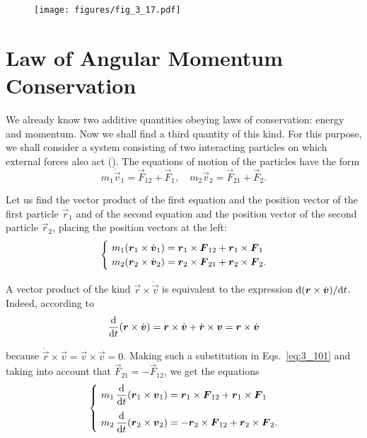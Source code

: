 \begin{figure}[t]
	\begin{center}
		\texttt{[image: figures/fig\_3\_17.pdf]}
		\caption[]{}
		\label{fig:3_17}
	\end{center}
	\vspace{-0.7cm}
\end{figure}

\section{Law of Angular Momentum Conservation}\label{sec:3_12}

We already know two additive quantities obeying laws of conservation: energy and momentum. Now we shall find a third quantity of this kind. For this purpose, we shall consider a system consisting of two interacting particles on which external forces also act (). The equations of motion of the particles have the form
\begin{equation*}
m_1\dot{\vec{v}}_1 = \vec{F}_{12} + \vec{F}_1,\quad m_2\dot{\vec{v}}_2 = \vec{F}_{21} + \vec{F}_2.
\end{equation*}

\noindent
Let us find the vector product of the first equation and the position vector of the first particle $\vec{r}_1$ and of the second equation and the position vector of the second particle $\vec{r}_2$, placing the position vectors at the left:
\begin{equation}\label{eq:3_101}
\begin{cases}
& \!\!\!\! m_1(\vec{r}_1\times\dot{\vec{v}}_1) = \vecprodind{r}{1}{F}{12} + \vecprodind{r}{1}{F}{1}\\
& \!\!\!\! m_2(\vec{r}_2\times\dot{\vec{v}}_2) = \vecprodind{r}{2}{F}{21} + \vecprodind{r}{2}{F}{2}.
\end{cases}
\end{equation}

A vector product of the kind $\vec{r}\times\dot{\vec{v}}$ is equivalent to the expression $\mathrm{d}(\boldsymbol{r}\times\dot{\boldsymbol{v}})/\mathrm{d} t$. Indeed, according to 
\begin{equation}\label{eq:3_102}
\frac{\mathrm{d}}{\mathrm{d} t}(\boldsymbol{r}\times\dot{\boldsymbol{v}}) = \boldsymbol{r}\times\dot{\boldsymbol{v}} + \dot{\boldsymbol{r}}\times\boldsymbol{v} = \boldsymbol{r}\times\dot{\boldsymbol{v}}
\end{equation}

\noindent
because $\dot{\vec{r}}\times\vec{v}=\vec{v}\times\vec{v}=0$. Making such a substitution in Eqs.~\eqref{eq:3_101} and taking into account that $\vec{F}_{21}=-\vec{F}_{12}$, we get the equations
\begin{equation}\label{eq:3_103}
\begin{cases}
& \!\!\!\! m_1\,\dfrac{\upd}{\deriv{t}}(\vec{r}_1\times\vec{v}_1) = \vecprodind{r}{1}{F}{12} + \vecprodind{r}{1}{F}{1}\\[10pt]
& \!\!\!\! m_2\,\dfrac{\upd}{\deriv{t}}(\vec{r}_2\times\vec{v}_2) = - \vecprodind{r}{2}{F}{12} + \vecprodind{r}{2}{F}{2}.
\end{cases}
\end{equation}

